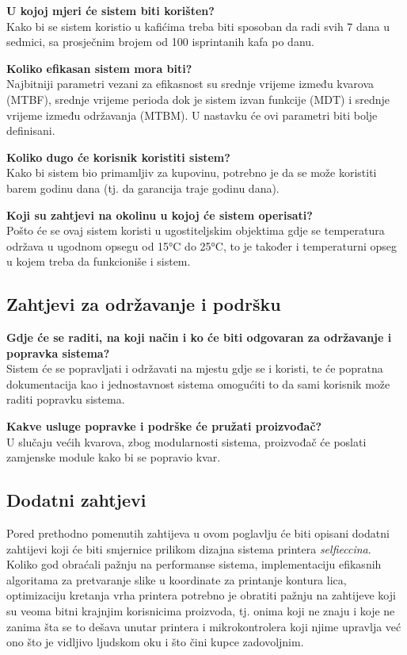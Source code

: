 \documentclass[12pt]{article}
\begin{document}
\textbf{U kojoj mjeri će sistem biti korišten?}\\
Kako bi se sistem koristio u kafićima treba biti sposoban da radi svih 7 dana u sedmici, sa prosječnim brojem od 100 isprintanih kafa po danu.

\textbf{Koliko efikasan sistem mora biti?}\\
Najbitniji parametri vezani za efikasnost su srednje vrijeme između kvarova (MTBF), srednje vrijeme perioda dok je sistem izvan funkcije (MDT) i srednje vrijeme između održavanja (MTBM). U nastavku će ovi parametri biti bolje definisani.

\textbf{Koliko dugo će korisnik koristiti sistem?}\\
Kako bi sistem bio primamljiv za kupovinu, potrebno je da se može koristiti barem godinu dana (tj. da garancija traje godinu dana).

\textbf{Koji su zahtjevi na okolinu u kojoj će sistem operisati?}\\
Pošto će se ovaj sistem koristi u ugostiteljskim objektima gdje se temperatura održava u ugodnom opsegu od 15°C do 25°C, to je također i temperaturni opseg u kojem treba da funkcioniše i sistem.

\newpage

\subsection{Zahtjevi za održavanje i podršku}
\textbf{Gdje će se raditi, na koji način i ko će biti odgovaran za održavanje i popravka sistema?}\\
Sistem će se popravljati i održavati na mjestu gdje se i koristi, te će popratna dokumentacija kao i jednostavnost sistema omogućiti to da sami korisnik može raditi popravku sistema.

\textbf{Kakve usluge popravke i podrške će pružati proizvođač?}\\
U slučaju većih kvarova, zbog modularnosti sistema, proizvođač će poslati zamjenske module kako bi se popravio kvar.  

\subsection{Dodatni zahtjevi}
Pored prethodno pomenutih zahtijeva u ovom poglavlju \'ce biti opisani dodatni zahtijevi koji \'ce biti smjernice prilikom dizajna sistema printera \textit{selfieccina}. Koliko god obra\'cali pa\v{z}nju na performanse sistema, implementaciju efikasnih algoritama za pretvaranje slike u koordinate za printanje kontura lica, optimizaciju kretanja vrha printera potrebno je obratiti pa\v{z}nju na zahtijeve koji su veoma bitni krajnjim korisnicima proizvoda, tj. onima koji ne znaju i koje ne zanima \v{s}ta se to de\v{s}ava unutar printera i mikrokontrolera koji njime upravlja ve\'c ono \v{s}to je vidljivo ljudskom oku i \v{s}to \v{c}ini kupce zadovoljnim.
\end{document}
